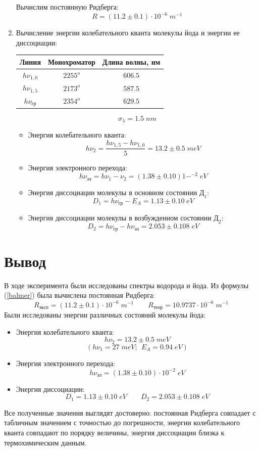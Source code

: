 \documentclass[a4paper,12pt]{article}
\begin{document}
\begin{enumerate}
		Вычислим постоянную Ридберга:
		\[R = (11.2  \pm 0.1)\cdot 10^{-6} \; m^{-1}\]
		
		\item Вычисление энергии колебательного кванта молекулы йода и энергии ее диссоциации:
		
		\begin{center}
			\begin{tabular}{|c|c|c|}
				\hline
				Линия & Монохроматор & Длина волны, нм \\ \hline
				$h \nu_{1,0}$ 	   	& $2255^o$ & $ 606.5 $ \\ \hline
				$h \nu_{1,5}$ 	   	& $2173^o$ & $ 587.5 $  \\ \hline
				$h \nu_\text{гр}$ 	& $2354^o$ & $ 629.5 $ \\ \hline
			\end{tabular}
		\end{center}
		\[\sigma_\lambda = 1.5 \; nm\]
		
		\begin{itemize}
			
			\item Энергия колебательного кванта:
			\[h \nu_2 = \dfrac{h \nu_{1,5} - h \nu_{1,0}}{5} = 13.2 \pm 0.5 \; m eV \]
			
			\item Энергия электронного перехода:
			\[h \nu_\text{эл} = h \nu_{1} - \nu_2 = (1.38 \pm 0.10)1-^{-2} \; eV \]
			
			\item Энергия диссоциации молекулы в основном состоянии $\text{Д}_1$:
			\[ D_1 = h \nu_\text{гр} - E_A = 1.13 \pm 0.10 \; eV \]
			
			\item Энергия диссоциации молекулы в возбужденном состоянии $\text{Д}_2$:
			\[ D_2 = h \nu_\text{гр} - h \nu_\text{эл} = 2.053 \pm 0.108 \; eV \]
			
		\end{itemize}
		
	\end{enumerate}
	
	\section{Вывод}
	В ходе эксперимента были исследованы спектры водорода и йода. Из формулы (\ref{balmer}) была вычислена постоянная Ридберга:
	\[
	R_\text{эксп} = (11.2  \pm 0.1)\cdot 10^{-6} \; m^{-1}
	\qquad
	R_\text{теор} = 10.9737\cdot 10^{-6} \; m^{-1}
	\]
	Были исследованы энергии различных состояний молекулы йода:
	\begin{itemize}
		
		\item Энергия колебательного кванта:
		\[h \nu_2 = 13.2 \pm 0.5 \; m eV \]
	\[(h \nu_1 = 27 \; m eV ; ~~E_A = 0.94 \; eV) \]
		
		\item Энергия электронного перехода:
		\[ h \nu_\text{эл} = (1.38 \pm 0.10)\cdot 10^{-2} \; eV \]
		
		\item Энергия диссоциации:
		\[
		D_1 = 1.13 \pm 0.10 \; eV
		\qquad
		D_2 = 2.053 \pm 0.108 \; eV 
		\]
	\end{itemize}
	
	Все полученные значения выглядят достоверно: постоянная Ридберга совпадает с табличным значением с точностью до погрешности, энергии колебательного кванта совпадают по порядку величины, энергия диссоциации близка к термохимическим данным.
\end{document}
